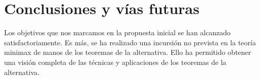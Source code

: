 \chapter{Conclusiones y vías futuras}
Los objetivos que nos marcamos en la propuesta inicial se han alcanzado satisfactoriamente. Es más, se ha realizado una incursión no prevista en la teoría minimax de manos de los teoremas de la alternativa. Ello ha permitido obtener una visión completa de las técnicas y aplicaciones de los teoremas de la alternativa.